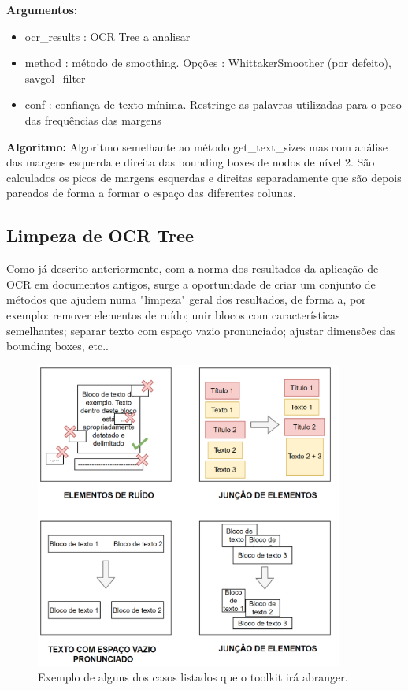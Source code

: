 \textbf{Argumentos:}
\begin{itemize}\setlength\itemsep{-0.3em}
	\vspace{-0.5em}
	\item ocr\_results : OCR Tree a analisar
	\item method : método de smoothing. Opções : WhittakerSmoother (por defeito), savgol\_filter
	\item conf : confiança de texto mínima. Restringe as palavras utilizadas para o peso das frequências das margens
\end{itemize}

\textbf{Algoritmo:} Algoritmo semelhante ao método get\_text\_sizes mas com análise das margens esquerda e direita das bounding boxes de nodos de nível 2. São calculados os picos de margens esquerdas e direitas separadamente que são depois pareados de forma a formar o espaço das diferentes colunas.





\subsection{Limpeza de OCR Tree}
\label{contribution_clean_ocr}

Como já descrito anteriormente, com a norma dos resultados da aplicação de OCR em documentos antigos, surge a oportunidade de criar um conjunto de métodos que ajudem numa "limpeza"  geral dos resultados, de forma a, por exemplo: remover elementos de ruído; unir blocos com características semelhantes; separar texto com espaço vazio pronunciado; ajustar dimensões das bounding boxes, etc..


\begin{figure}[H]
	\centering
	\includegraphics[width=0.9\textwidth]{images/ilustracoes/clean_ocr_cases_example.png}
	\caption{Exemplo de alguns dos casos listados que o toolkit irá abranger.}
	\label{fig:clean_ocr_cases_example}
\end{figure}



